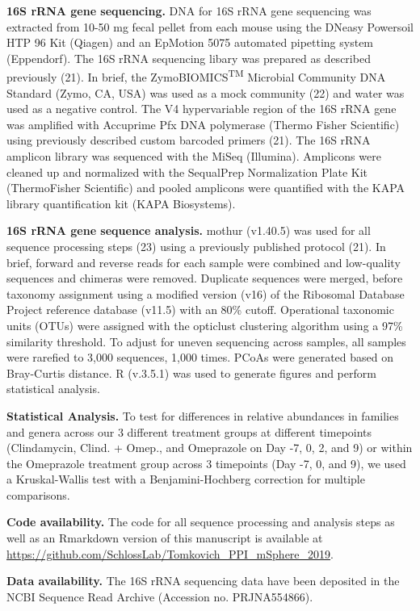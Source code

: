 \documentclass[11pt,]{article}
\begin{document}
\textbf{16S rRNA gene sequencing.} DNA for 16S rRNA gene sequencing was
extracted from 10-50 mg fecal pellet from each mouse using the DNeasy
Powersoil HTP 96 Kit (Qiagen) and an EpMotion 5075 automated pipetting
system (Eppendorf). The 16S rRNA sequencing libary was prepared as
described previously (21). In brief, the ZymoBIOMICS\textsuperscript{TM}
Microbial Community DNA Standard (Zymo, CA, USA) was used as a mock
community (22) and water was used as a negative control. The V4
hypervariable region of the 16S rRNA gene was amplified with Accuprime
Pfx DNA polymerase (Thermo Fisher Scientific) using previously described
custom barcoded primers (21). The 16S rRNA amplicon library was
sequenced with the MiSeq (Illumina). Amplicons were cleaned up and
normalized with the SequalPrep Normalization Plate Kit (ThermoFisher
Scientific) and pooled amplicons were quantified with the KAPA library
quantification kit (KAPA Biosystems).

\textbf{16S rRNA gene sequence analysis.} mothur (v1.40.5) was used for
all sequence processing steps (23) using a previously published protocol
(21). In brief, forward and reverse reads for each sample were combined
and low-quality sequences and chimeras were removed. Duplicate sequences
were merged, before taxonomy assignment using a modified version (v16)
of the Ribosomal Database Project reference database (v11.5) with an
80\% cutoff. Operational taxonomic units (OTUs) were assigned with the
opticlust clustering algorithm using a 97\% similarity threshold. To
adjust for uneven sequencing across samples, all samples were rarefied
to 3,000 sequences, 1,000 times. PCoAs were generated based on
Bray-Curtis distance. R (v.3.5.1) was used to generate figures and
perform statistical analysis.

\textbf{Statistical Analysis.} To test for differences in relative
abundances in families and genera across our 3 different treatment
groups at different timepoints (Clindamycin, Clind. + Omep., and
Omeprazole on Day -7, 0, 2, and 9) or within the Omeprazole treatment
group across 3 timepoints (Day -7, 0, and 9), we used a Kruskal-Wallis
test with a Benjamini-Hochberg correction for multiple comparisons.

\textbf{Code availability.} The code for all sequence processing and
analysis steps as well as an Rmarkdown version of this manuscript is
available at
\url{https://github.com/SchlossLab/Tomkovich_PPI_mSphere_2019}.

\textbf{Data availability.} The 16S rRNA sequencing data have been
deposited in the NCBI Sequence Read Archive (Accession no. PRJNA554866).
\end{document}
